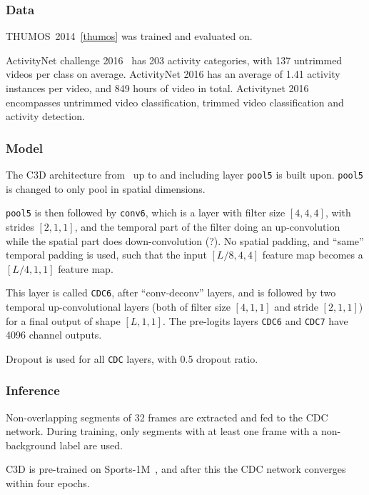 \documentclass[a4paper, 12pt]{article}
\begin{document}
\subsubsection{Data}

THUMOS~2014~\ref{thumos} was trained and evaluated on.

ActivityNet challenge 2016~\citet{Heilbron_2015_CVPR} has 203 activity
categories, with 137 untrimmed videos per class on average. ActivityNet 2016
has an average of 1.41 activity instances per video, and 849 hours of video in
total. Activitynet 2016 encompasses untrimmed video classification, trimmed
video classification and activity detection.

\subsubsection{Model}

The C3D architecture
from~\citet{DBLP:journals/corr/TranBFTP15, DBLP:journals/corr/TranBFTP14} up to
and including layer \verb|pool5| is built upon. \verb|pool5| is changed to only
pool in spatial dimensions.

\verb|pool5| is then followed by \verb|conv6|, which is a layer with filter
size $[4, 4, 4]$, with strides $[2, 1, 1]$, and the temporal part of the filter
doing an up-convolution while the spatial part does down-convolution (?). No
spatial padding, and ``same'' temporal padding is used, such that the input
$[L/8, 4, 4]$ feature map becomes a $[L/4, 1, 1]$ feature map.

This layer is called \verb|CDC6|, after ``conv-deconv'' layers, and is followed
by two temporal up-convolutional layers (both of filter size $[4, 1, 1]$ and
stride $[2, 1, 1]$) for a final output of shape $[L, 1, 1]$.  The pre-logits
layers \verb|CDC6| and \verb|CDC7| have 4096 channel outputs.

Dropout is used for all \verb|CDC| layers, with 0.5 dropout ratio.

\subsubsection{Inference}

Non-overlapping segments of 32 frames are extracted and fed to the CDC network.
During training, only segments with at least one frame with a non-background
label are used.

C3D is pre-trained on Sports-1M~\citet{KarpathyCVPR14}, and after this the CDC
network converges within four epochs.
\end{document}
